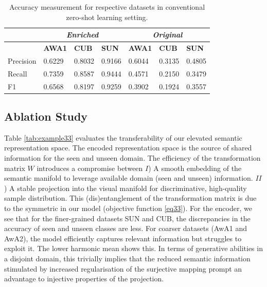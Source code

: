 \documentclass{article}
\begin{document}
\begin{table}[h]
\centering
\footnotesize
\begin{tabular}{llll|lll}

          & \multicolumn{3}{c|}{\textit{Enriched}}      & \multicolumn{3}{c}{\textit{Original}}       \\
          \toprule
          & \textbf{AWA1} & \textbf{CUB} & \textbf{SUN} & \textbf{AWA1} & \textbf{CUB} & \textbf{SUN} \\
          \hline
Precision & 0.6229        & 0.8032       & 0.9166       & 0.6044        & 0.3135       & 0.4805       \\
Recall    & 0.7359        & 0.8587       & 0.9444       & 0.4571        & 0.2150       & 0.3479       \\
F1        & 0.6568        & 0.8197       & 0.9259       & 0.3902        & 0.1924       & 0.3557        \\   
    \bottomrule
\end{tabular}
\caption{Accuracy measurement for respective datasets in conventional zero-shot learning setting.}
\label{tab:accuracy}
\end{table}


\subsection{Ablation Study}
Table \ref{tab:example33} evaluates the transferability of our elevated semantic representation space. The encoded representation space is the source of shared information for the seen and unseen domain. The efficiency of the transformation matrix $W$ introduces a compromise between $I$) A smooth embedding of the semantic manifold to leverage available domain (seen and unseen) information. $II$) A stable projection into the visual manifold for discriminative, high-quality sample distribution. This (dis)entanglement of the transformation matrix is due to the symmetric in our model (objective function \ref{eq33}). For the encoder, we see that for the finer-grained datasets SUN and CUB, the discrepancies in the accuracy of seen and unseen classes are less. For coarser datasets (AwA1 and AwA2), the model efficiently captures relevant information but struggles to exploit it. The lower harmonic mean shows this. In terms of generative abilities in a disjoint domain, this trivially implies that the reduced semantic information stimulated by increased regularisation of the surjective mapping prompt an advantage to injective properties of the projection.
\end{document}
